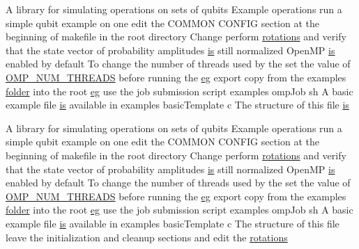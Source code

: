 \begin{DoxyCompactItemize}
\item 
A library for simulating operations on sets of qubits Example operations run a simple qubit example on one edit the COMMON CONFIG section at the beginning of makefile in the root directory Change perform \hyperlink{README_8md_aa51a655a099aacfa420285f13958dee7}{rotations} and verify that the state vector of probability amplitudes \hyperlink{README_8md_a2a622829425af2df994a6f7c6deb0c91}{is} still normalized OpenMP \hyperlink{README_8md_a2a622829425af2df994a6f7c6deb0c91}{is} enabled by default To change the number of threads used by the set the value of \hyperlink{README_8md_a79266f70cc0ecc5861ae53ebd180bf65}{OMP\_\-NUM\_\-THREADS} before running the \hyperlink{README_8md_accf5ef1dd79776855485925f622a4f09}{eg} export copy from the examples \hyperlink{README_8md_ac7a6c2e0f131857c641dc6c0bc4a395a}{folder} into the root \hyperlink{README_8md_accf5ef1dd79776855485925f622a4f09}{eg} use the job submission script examples ompJob sh A basic example file \hyperlink{README_8md_a2a622829425af2df994a6f7c6deb0c91}{is} available in examples basicTemplate c The structure of this file \hyperlink{README_8md_a2a622829425af2df994a6f7c6deb0c91}{is}
\item 
A library for simulating operations on sets of qubits Example operations run a simple qubit example on one edit the COMMON CONFIG section at the beginning of makefile in the root directory Change perform \hyperlink{README_8md_aa51a655a099aacfa420285f13958dee7}{rotations} and verify that the state vector of probability amplitudes \hyperlink{README_8md_a2a622829425af2df994a6f7c6deb0c91}{is} still normalized OpenMP \hyperlink{README_8md_a2a622829425af2df994a6f7c6deb0c91}{is} enabled by default To change the number of threads used by the set the value of \hyperlink{README_8md_a79266f70cc0ecc5861ae53ebd180bf65}{OMP\_\-NUM\_\-THREADS} before running the \hyperlink{README_8md_accf5ef1dd79776855485925f622a4f09}{eg} export copy from the examples \hyperlink{README_8md_ac7a6c2e0f131857c641dc6c0bc4a395a}{folder} into the root \hyperlink{README_8md_accf5ef1dd79776855485925f622a4f09}{eg} use the job submission script examples ompJob sh A basic example file \hyperlink{README_8md_a2a622829425af2df994a6f7c6deb0c91}{is} available in examples basicTemplate c The structure of this file leave the initialization and cleanup sections and edit the \hyperlink{README_8md_aa51a655a099aacfa420285f13958dee7}{rotations}
\item 

\end{DoxyCompactItemize}
